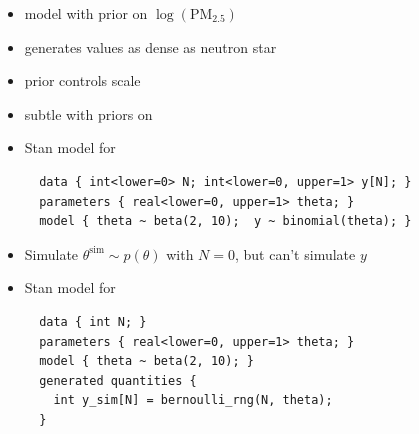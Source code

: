 \documentclass[10pt]{report}
\newcommand{\simvar}[1]{#1^{\textrm{sim}}}
\begin{document}
\vspace*{-10pt}
\begin{itemize}
\item {} model with prior on
  $\log(\textrm{PM}_{2.5})$
\item {} generates values as dense as neutron star
\item {} prior controls scale
\item subtle with priors on 
\end{itemize}

\begin{itemize}
\item Stan model for 
\vspace*{-6pt}
{\footnotesize
\begin{verbatim}
  data { int<lower=0> N; int<lower=0, upper=1> y[N]; }
  parameters { real<lower=0, upper=1> theta; }
  model { theta ~ beta(2, 10);  y ~ binomial(theta); }
\end{verbatim}
}
\item Simulate $\simvar{\theta} \sim p(\theta)$ with $N = 0$, but
  can't simulate $y$
\item Stan model for 
\vspace*{-6pt}
{\footnotesize
\begin{verbatim}
  data { int N; }
  parameters { real<lower=0, upper=1> theta; }
  model { theta ~ beta(2, 10); }
  generated quantities { 
    int y_sim[N] = bernoulli_rng(N, theta);
  }
\end{verbatim}
}
\end{itemize}
\end{document}
